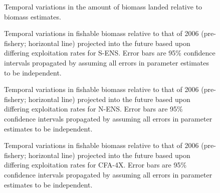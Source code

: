 \documentclass[11pt]{article}
\newcommand*{\D}{.}  %
\begin{document}
\clearpage \newpage


\begin{figure}[ht]
\begin{center}
\end{center}
\caption{Temporal variations in the amount of biomass landed relative to biomass estimates.}
\label{relativeF}
\end{figure}

\clearpage \newpage


\begin{figure}[ht]
\begin{center}
\end{center}
\caption{Temporal variations in fishable biomass relative to that of 2006 (pre-fishery; horizontal line) projected into the future based upon differing exploitation rates for S-ENS. Error bars are 95\% confidence intervals propagated by assuming all errors in parameter estimates to be independent.}
\label{projections.south}
\end{figure}


\clearpage \newpage

\begin{figure}[ht]
\begin{center}
\end{center}
\caption{Temporal variations in fishable biomass relative to that of 2006 (pre-fishery; horizontal line) projected into the future based upon differing exploitation rates for N-ENS.  Error bars are 95\% confidence intervals propagated by assuming all errors in parameter estimates to be independent.}
\label{projections.north}
\end{figure}


\clearpage \newpage


\begin{figure}[ht]
\begin{center}
\end{center}
\caption{Temporal variations in fishable biomass relative to that of 2006 (pre-fishery; horizontal line) projected into the future based upon differing exploitation rates for CFA-4X.  Error bars are 95\% confidence intervals propagated by assuming all errors in parameter estimates to be independent.}
\label{projections.4x}
\end{figure}
\end{document}
